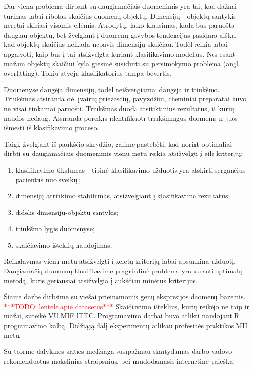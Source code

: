 Dar viena problema dirbant su daugiamačiais duomenimis yra tai, kad dažnai
turimas labai ribotas skaičius duomenų objektų. Dimensijų - objektų santykis 
neretai skiriasi visomis eilėmis. Atrodytų, laiko klausimas, kada bus paruošta
daugiau objektų, bet žvelgiant į duomenų gavybos tendencijas pasidaro aišku, kad
objektų skaičius neikada nepavis dimensijų skaičiau. Todėl reikia labai apgalvoti,
kaip bus į tai atsižvelgta kuriant klasifikavimo modelius. Nes esant mažam
objektų skaičiui kyla grėsmė susidurti su persimokymo problema (angl. 
overfitting). Tokiu atveju klasifikatorius tampa bevertis.

Duomenyse daugėja dimensijų, todėl neišvengiamai daugėja ir triukšmo. 
Triukšmas atsiranda
dėl įvairių priežasčių, pavyzdžiui, cheminiai preparatai buvo ne visai tinkamai
paruošti. Triukšmas duoda atsitiktinius rezultatus, iš kurių naudos nedaug.
Atsiranda poreikis identifikuoti triukšmingus duomenis ir juos išmesti iš 
klasifikavimo proceso.

Taigi, žvelgiant iš paukščio skrydžio, galime pastebėti, kad norint optimaliai
dirbti su daugiamačiais duomenimis vienu metu reikia atsižvelgti į eilę kriterijų:
\begin{enumerate}
 \item klasifikavimo tikslumas - tipinė klasifikavimo užduotis yra atskirti
 sergančius pacientus nuo sveikų.;
 \item dimensijų atrinkimo stabilumas, atsižvelgiant į klasifikavimo rezultatus;
 \item didelis dimensijų-objektų santykis;
 \item triukšmo lygis duomenyse;
 \item skaičiavimo išteklių naudojimas.
\end{enumerate}
Reikalavmas vienu metu atsižvelgti į keletą kriterijų labai apsunkina užduotį.
Daugiamačių duomenų klasifikavime pragrindinė problema yra surasti optimalų 
metodą, kuris geriausiai atsižvelgia į aukščiau minėtus kriterijus.

Šiame darbe dirbsime su viešai prieinamomis genų ekspresijos duomenų bazėmis.
\textcolor{red}{***TODO: lentelė apie datasetus***}
Skaičiavimo išteklius, kurių reikėjo ne taip ir mažai, suteikė VU MIF ITTC.
Programavimo darbai buvo atlikti naudojant R programavimo kalbą. Didžiąją
dalį eksperimentų atlikau profesinės praktikos MII metu.

Su teorine dalykinės srities medžiaga susipažinau skaitydamas darbo vadovo 
rekomenduotus mokslinius straipsnius, bei naudodamasis internetine paieška.

